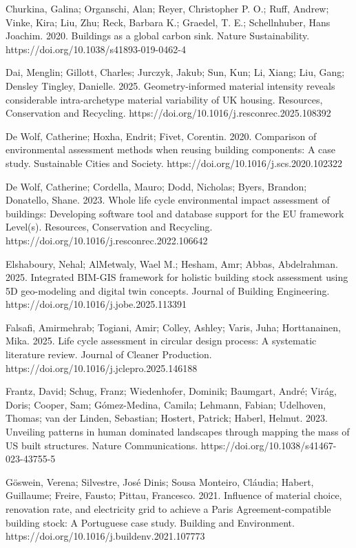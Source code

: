 Churkina, Galina; Organschi, Alan; Reyer, Christopher P. O.; Ruff, Andrew; Vinke, Kira; Liu, Zhu; Reck, Barbara K.; Graedel, T. E.; Schellnhuber, Hans Joachim. 2020. Buildings as a global carbon sink. Nature Sustainability. https://doi.org/10.1038/s41893-019-0462-4

Dai, Menglin; Gillott, Charles; Jurczyk, Jakub; Sun, Kun; Li, Xiang; Liu, Gang; Densley Tingley, Danielle. 2025. Geometry-informed material intensity reveals considerable intra-archetype material variability of UK housing. Resources, Conservation and Recycling. https://doi.org/10.1016/j.resconrec.2025.108392

De Wolf, Catherine; Hoxha, Endrit; Fivet, Corentin. 2020. Comparison of environmental assessment methods when reusing building components: A case study. Sustainable Cities and Society. https://doi.org/10.1016/j.scs.2020.102322

De Wolf, Catherine; Cordella, Mauro; Dodd, Nicholas; Byers, Brandon; Donatello, Shane. 2023. Whole life cycle environmental impact assessment of buildings: Developing software tool and database support for the EU framework Level(s). Resources, Conservation and Recycling. https://doi.org/10.1016/j.resconrec.2022.106642

Elshaboury, Nehal; AlMetwaly, Wael M.; Hesham, Amr; Abbas, Abdelrahman. 2025. Integrated BIM-GIS framework for holistic building stock assessment using 5D geo-modeling and digital twin concepts. Journal of Building Engineering. https://doi.org/10.1016/j.jobe.2025.113391

Falsafi, Amirmehrab; Togiani, Amir; Colley, Ashley; Varis, Juha; Horttanainen, Mika. 2025. Life cycle assessment in circular design process: A systematic literature review. Journal of Cleaner Production. https://doi.org/10.1016/j.jclepro.2025.146188

Frantz, David; Schug, Franz; Wiedenhofer, Dominik; Baumgart, André; Virág, Doris; Cooper, Sam; Gómez-Medina, Camila; Lehmann, Fabian; Udelhoven, Thomas; van der Linden, Sebastian; Hostert, Patrick; Haberl, Helmut. 2023. Unveiling patterns in human dominated landscapes through mapping the mass of US built structures. Nature Communications. https://doi.org/10.1038/s41467-023-43755-5

Göswein, Verena; Silvestre, José Dinis; Sousa Monteiro, Cláudia; Habert, Guillaume; Freire, Fausto; Pittau, Francesco. 2021. Influence of material choice, renovation rate, and electricity grid to achieve a Paris Agreement-compatible building stock: A Portuguese case study. Building and Environment. https://doi.org/10.1016/j.buildenv.2021.107773

